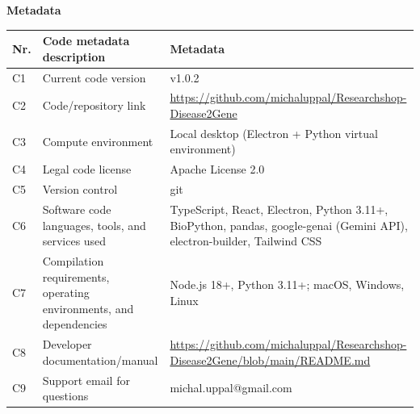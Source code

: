 \noindent\textbf{Metadata}\par
\vspace{0.45em}
{\footnotesize
\setlength{\tabcolsep}{5pt}
\renewcommand{\arraystretch}{1.05}
\begin{tabularx}{\textwidth}{>{\raggedright\arraybackslash}p{0.7cm} >{\raggedright\arraybackslash}p{4.0cm} X}
\toprule
\textbf{Nr.} & \textbf{Code metadata description} & \textbf{Metadata} \\
\midrule
C1 & Current code version & v1.0.2 \\
C2 & Code/repository link & \url{https://github.com/michaluppal/Researchshop-Disease2Gene} \\
C3 & Compute environment & Local desktop (Electron + Python virtual environment) \\
C4 & Legal code license & Apache License 2.0 \\
C5 & Version control & git \\
C6 & Software code languages, tools, and services used & TypeScript, React, Electron, Python 3.11+, BioPython, pandas, google-genai (Gemini API), electron-builder, Tailwind CSS \\
C7 & Compilation requirements, operating environments, and dependencies & Node.js 18+, Python 3.11+; macOS, Windows, Linux \\
C8 & Developer documentation/manual & \url{https://github.com/michaluppal/Researchshop-Disease2Gene/blob/main/README.md} \\
C9 & Support email for questions & michal.uppal@gmail.com \\
\bottomrule
\end{tabularx}
\par}
